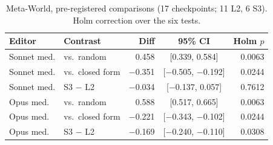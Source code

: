 \begin{table}[t]
\centering
\caption{Meta-World, pre-registered comparisons (17 checkpoints; 11 L2, 6 S3). Holm correction over the six tests.}
\label{tab:mw}
\footnotesize
\setlength{\tabcolsep}{3pt}
\begin{tabular}{@{}llrcr@{}}
\toprule
Editor & Contrast & Diff & 95\% CI & Holm $p$ \\
\midrule
Sonnet med. & vs.\ random & 0.458 & [0.339, 0.584] & 0.0063 \\
Sonnet med. & vs.\ closed form & $-$0.351 & [$-$0.505, $-$0.192] & 0.0244 \\
Sonnet med. & S3 $-$ L2 & $-$0.034 & [$-$0.137, 0.057] & 0.7612 \\
Opus med. & vs.\ random & 0.588 & [0.517, 0.665] & 0.0063 \\
Opus med. & vs.\ closed form & $-$0.221 & [$-$0.343, $-$0.102] & 0.0244 \\
Opus med. & S3 $-$ L2 & $-$0.169 & [$-$0.240, $-$0.110] & 0.0308 \\
\bottomrule
\end{tabular}
\end{table}

